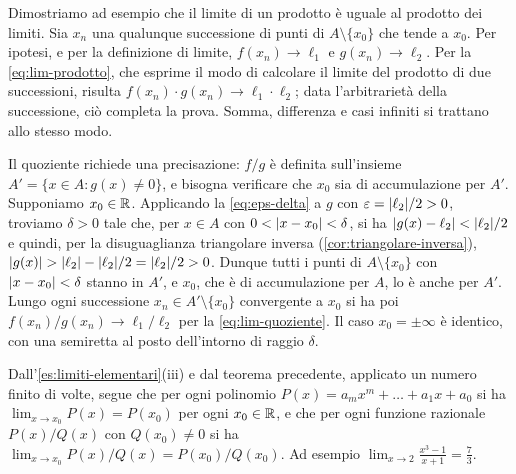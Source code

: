 \begin{dimostrazione}
Dimostriamo ad esempio che il limite di un prodotto è uguale al prodotto dei limiti.
Sia $x_{n}$ una qualunque successione di punti di $A\setminus\{x_{0}\}$ che tende a
$x_{0}$. Per ipotesi, e per la definizione di limite, $f(x_{n})\to\ell_{1}$ e
$g(x_{n})\to\ell_{2}$. Per la \eqref{eq:lim-prodotto}, che esprime il modo di calcolare il
limite del prodotto di due successioni, risulta $f(x_{n})\cdot g(x_{n})\to\ell_{1}\cdot\ell_{2}$;
data l'arbitrarietà della successione, ciò completa la prova. Somma, differenza e casi
infiniti si trattano allo stesso modo.

Il quoziente richiede una precisazione: $f/g$ è definita sull'insieme
$A'=\{x\in A : g(x)\neq0\}$, e bisogna verificare che $x_{0}$ sia di accumulazione per
$A'$. Supponiamo $x_{0}\in\mathbb{R}$. Applicando la \eqref{eq:eps-delta} a $g$ con
$\varepsilon=\lvert \ell_{2}\rvert/2>0$, troviamo $\delta>0$ tale che, per $x\in A$ con
$0<\lvert x-x_{0}\rvert<\delta$, si ha $\lvert g(x)-\ell_{2}\rvert<\lvert \ell_{2}\rvert/2$ e quindi, per la
disuguaglianza triangolare inversa (\cref{cor:triangolare-inversa}),
$\lvert g(x)\rvert>\lvert \ell_{2}\rvert-\lvert \ell_{2}\rvert/2=\lvert \ell_{2}\rvert/2>0$. Dunque tutti i punti di
$A\setminus\{x_{0}\}$ con $\lvert x-x_{0}\rvert<\delta$ stanno in $A'$, e $x_{0}$, che è di
accumulazione per $A$, lo è anche per $A'$. Lungo ogni successione $x_{n}\in A'\setminus\{x_{0}\}$
convergente a $x_{0}$ si ha poi $f(x_{n})/g(x_{n})\to\ell_{1}/\ell_{2}$ per la
\eqref{eq:lim-quoziente}. Il caso $x_{0}=\pm\infty$ è identico, con una semiretta al posto
dell'intorno di raggio $\delta$.
\end{dimostrazione}

\begin{esempio}\label{es:limite-polinomi}
Dall'\cref{es:limiti-elementari}(iii) e dal teorema precedente, applicato un numero
finito di volte, segue che per ogni polinomio $P(x)=a_{m}x^{m}+\dots+a_{1}x+a_{0}$ si ha
$\lim_{x\to x_{0}}P(x)=P(x_{0})$ per ogni $x_{0}\in\mathbb{R}$, e che per ogni funzione razionale
$P(x)/Q(x)$ con $Q(x_{0})\neq0$ si ha $\lim_{x\to x_{0}}P(x)/Q(x)=P(x_{0})/Q(x_{0})$. Ad
esempio $\lim_{x\to2}\frac{x^{3}-1}{x+1}=\frac73$.
\end{esempio}

